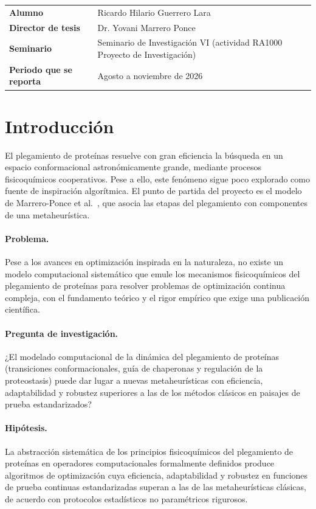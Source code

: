 \documentclass[11pt,letterpaper]{article}
\begin{document}
\vspace{4pt}
\noindent\begin{tabularx}{\textwidth}{@{}lX@{}}
\textbf{Alumno} & Ricardo Hilario Guerrero Lara \\
\textbf{Director de tesis} & Dr. Yovani Marrero Ponce \\
\textbf{Seminario} & Seminario de Investigación VI (actividad RA1000 Proyecto de Investigación) \\
\textbf{Periodo que se reporta} & Agosto a noviembre de 2026 \\
\end{tabularx}

\section{Introducción}

El plegamiento de proteínas resuelve con gran eficiencia la búsqueda en un espacio conformacional astronómicamente grande, mediante procesos fisicoquímicos cooperativos. Pese a ello, este fenómeno sigue poco explorado como fuente de inspiración algorítmica. El punto de partida del proyecto es el modelo de Marrero-Ponce et al.~\cite{marrero2021}, que asocia las etapas del plegamiento con componentes de una metaheurística.

\paragraph{Problema.} Pese a los avances en optimización inspirada en la naturaleza, no existe un modelo computacional sistemático que emule los mecanismos fisicoquímicos del plegamiento de proteínas para resolver problemas de optimización continua compleja, con el fundamento teórico y el rigor empírico que exige una publicación científica.

\paragraph{Pregunta de investigación.} ¿El modelado computacional de la dinámica del plegamiento de proteínas (transiciones conformacionales, guía de chaperonas y regulación de la proteostasis) puede dar lugar a nuevas metaheurísticas con eficiencia, adaptabilidad y robustez superiores a las de los métodos clásicos en paisajes de prueba estandarizados?

\paragraph{Hipótesis.} La abstracción sistemática de los principios fisicoquímicos del plegamiento de proteínas en operadores computacionales formalmente definidos produce algoritmos de optimización cuya eficiencia, adaptabilidad y robustez en funciones de prueba continuas estandarizadas superan a las de las metaheurísticas clásicas, de acuerdo con protocolos estadísticos no paramétricos rigurosos.
\end{document}
